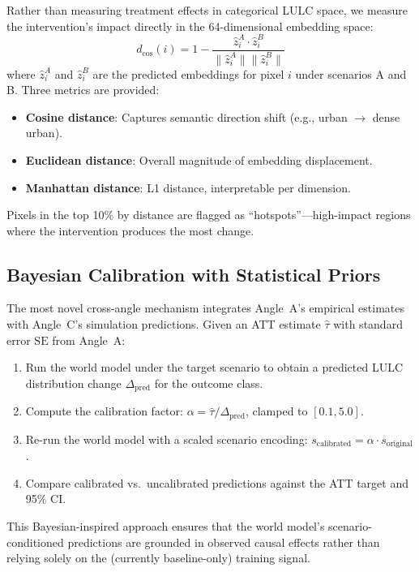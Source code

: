 \documentclass{article}
\begin{document}
Rather than measuring treatment effects in categorical LULC space, we measure the intervention's impact directly in the 64-dimensional embedding space:
\begin{equation}
d_{\cos}(i) = 1 - \frac{\hat{z}^A_i \cdot \hat{z}^B_i}{\|\hat{z}^A_i\| \|\hat{z}^B_i\|}
\end{equation}
where $\hat{z}^A_i$ and $\hat{z}^B_i$ are the predicted embeddings for pixel $i$ under scenarios A and B. Three metrics are provided:
\begin{itemize}
\item \textbf{Cosine distance}: Captures semantic direction shift (e.g., urban $\to$ dense urban).
\item \textbf{Euclidean distance}: Overall magnitude of embedding displacement.
\item \textbf{Manhattan distance}: L1 distance, interpretable per dimension.
\end{itemize}
Pixels in the top 10\% by distance are flagged as ``hotspots''---high-impact regions where the intervention produces the most change.

\subsection{Bayesian Calibration with Statistical Priors}

The most novel cross-angle mechanism integrates Angle~A's empirical estimates with Angle~C's simulation predictions. Given an ATT estimate $\hat{\tau}$ with standard error $\text{SE}$ from Angle~A:

\begin{enumerate}
\item Run the world model under the target scenario to obtain a predicted LULC distribution change $\Delta_{\text{pred}}$ for the outcome class.
\item Compute the calibration factor: $\alpha = \hat{\tau} / \Delta_{\text{pred}}$, clamped to $[0.1, 5.0]$.
\item Re-run the world model with a scaled scenario encoding: $s_{\text{calibrated}} = \alpha \cdot s_{\text{original}}$.
\item Compare calibrated vs.\ uncalibrated predictions against the ATT target and 95\% CI.
\end{enumerate}

This Bayesian-inspired approach ensures that the world model's scenario-conditioned predictions are grounded in observed causal effects rather than relying solely on the (currently baseline-only) training signal.
\end{document}

